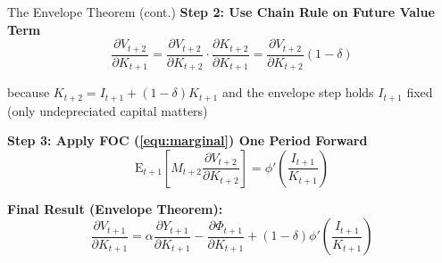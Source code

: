 \documentclass{beamer}
\begin{document}
\begin{frame}{The Envelope Theorem (cont.)}
    \textbf{Step 2: Use Chain Rule on Future Value Term}
    \begin{equation*}
        \frac{\partial V_{t+2}}{\partial K_{t+1}} = \frac{\partial V_{t+2}}{\partial K_{t+2}} \cdot \frac{\partial K_{t+2}}{\partial K_{t+1}} = \frac{\partial V_{t+2}}{\partial K_{t+2}} (1-\delta)
    \end{equation*}
    
    because $K_{t+2} = I_{t+1} + (1-\delta)K_{t+1}$ and the envelope step holds $I_{t+1}$ fixed (only undepreciated capital matters)
    
    
    \textbf{Step 3: Apply FOC (\ref{equ:marginal}) One Period Forward}
    \begin{equation*}
        \mathrm{E}_{t+1}\left[M_{t+2} \frac{\partial V_{t+2}}{\partial K_{t+2}}\right] = \phi'\left(\frac{I_{t+1}}{K_{t+1}}\right)
    \end{equation*}
    
    
    \textbf{Final Result (Envelope Theorem):}
    \begin{equation}\label{equ:envelope theorem}
        \boxed{
        \frac{\partial V_{t+1}}{\partial K_{t+1}} = \alpha \frac{\partial Y_{t+1}}{\partial K_{t+1}} - \frac{\partial \Phi_{t+1}}{\partial K_{t+1}} + (1-\delta) \phi'\left(\frac{I_{t+1}}{K_{t+1}}\right)
        }
    \end{equation}
\end{frame}
\end{document}
